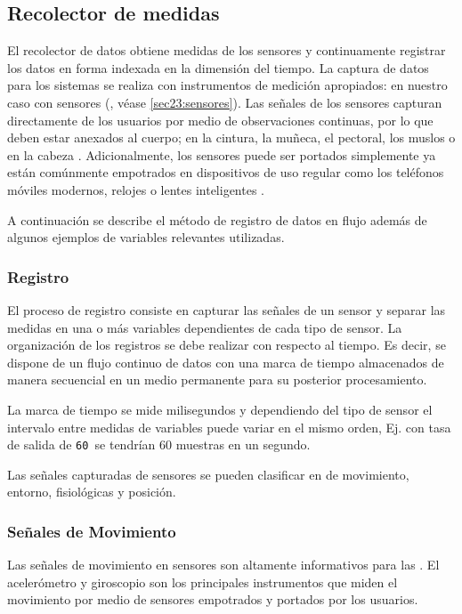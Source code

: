 \subsection{Recolector de medidas}

\label{sec421:recolector-datos}El recolector de datos obtiene medidas
de los sensores y continuamente registrar los datos en forma indexada
en la dimensión del tiempo. La captura de datos para los sistemas
 se realiza con instrumentos de medición apropiados: en
nuestro caso con sensores (, véase \ref{sec23:sensores}).
Las señales de los sensores capturan directamente de los usuarios
por medio de observaciones continuas, por lo que deben estar anexados
al cuerpo; en la cintura, la muñeca, el pectoral, los muslos o en
la cabeza \cite{Bao2004}. Adicionalmente, los sensores puede ser
portados simplemente ya están comúnmente empotrados en dispositivos
de uso regular como los teléfonos móviles modernos, relojes o lentes
inteligentes \cite{LaraLabrador2012,Choudhury2008}.

A continuación se describe el método de registro de datos en flujo
además de algunos ejemplos de variables relevantes utilizadas.

\subsubsection{Registro}

El proceso de registro consiste en capturar las señales de un sensor
y separar las medidas en una o más variables dependientes de cada
tipo de sensor. La organización de los registros se debe realizar
con respecto al tiempo. Es decir, se dispone de un flujo continuo
de datos con una marca de tiempo almacenados de manera secuencial
en un medio permanente para su posterior procesamiento. 

La marca de tiempo se mide milisegundos y dependiendo del tipo de
sensor el intervalo entre medidas de variables puede variar en el
mismo orden, Ej. con tasa de salida de \texttt{60  }se tendrían
60 muestras en un segundo. 

Las señales capturadas de sensores se pueden clasificar en de movimiento,
entorno, fisiológicas y posición.

\subsubsection{Señales de Movimiento}

Las señales de movimiento en sensores son altamente informativos para
las . El acelerómetro y giroscopio son los principales
instrumentos que miden el movimiento por medio de sensores empotrados
y portados por los usuarios.

